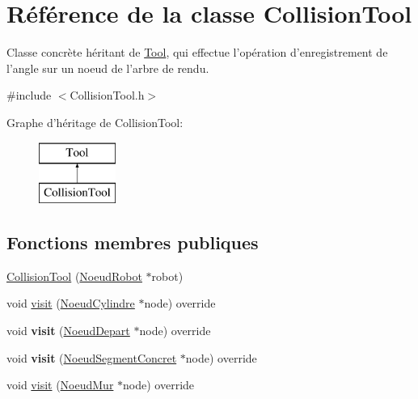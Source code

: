 \hypertarget{class_collision_tool}{\section{Référence de la classe Collision\-Tool}
\label{class_collision_tool}
}


Classe concrète héritant de \hyperlink{class_tool}{Tool}, qui effectue l'opération d'enregistrement de l'angle sur un noeud de l'arbre de rendu.  




{\ttfamily \#include $<$Collision\-Tool.\-h$>$}

Graphe d'héritage de Collision\-Tool\-:\begin{figure}[H]
\begin{center}
\leavevmode
\includegraphics[height=2.000000cm]{class_collision_tool}
\end{center}
\end{figure}
\subsection*{Fonctions membres publiques}
\begin{DoxyCompactItemize}
\item 
\hyperlink{group__inf2990_ga2f19aaeb96c50199582fbd6146a22505}{Collision\-Tool} (\hyperlink{class_noeud_robot}{Noeud\-Robot} $\ast$robot)
\item 
void \hyperlink{group__inf2990_gaeabc2a2158a27714c8db5c076fe40720}{visit} (\hyperlink{class_noeud_cylindre}{Noeud\-Cylindre} $\ast$node) override
\item 
\hypertarget{class_collision_tool_a899bce8343b9fd961a525f4b9b70501f}{void {\bfseries visit} (\hyperlink{class_noeud_depart}{Noeud\-Depart} $\ast$node) override}\label{class_collision_tool_a899bce8343b9fd961a525f4b9b70501f}

\item 
\hypertarget{class_collision_tool_a7a7d8fe3caee1571a307190b9be35e7b}{void {\bfseries visit} (\hyperlink{class_noeud_segment_concret}{Noeud\-Segment\-Concret} $\ast$node) override}\label{class_collision_tool_a7a7d8fe3caee1571a307190b9be35e7b}

\item 
void \hyperlink{group__inf2990_ga25177ba7c7bb3179b850f4b702906b38}{visit} (\hyperlink{class_noeud_mur}{Noeud\-Mur} $\ast$node) override
\end{DoxyCompactItemize}
